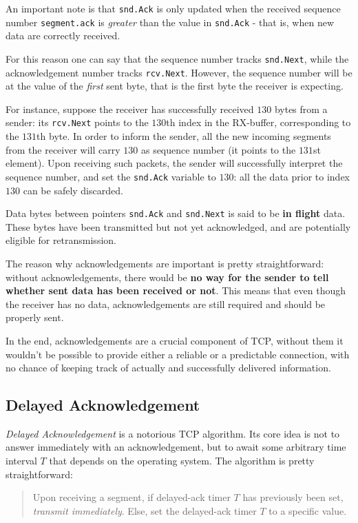 \documentclass[10pt]{\classname}
\begin{document}
An important note is that \texttt{snd.Ack} is only updated when the received
sequence number \texttt{segment.ack} is \emph{greater} than the value in
\texttt{snd.Ack} \-- that is, when new data are correctly received.

For this reason one can say that the sequence number tracks \texttt{snd.Next},
while the acknowledgement number tracks \texttt{rcv.Next}. However, the
sequence number will be at the value of the \emph{first} sent byte, that is the
first byte the receiver is expecting.

For instance, suppose the receiver has successfully received $130$ bytes from a
sender: its \texttt{rcv.Next} points to the $130$th index in the RX-buffer,
corresponding to the $131$th byte. In order to inform the sender, all the new
incoming segments from the receiver will carry $130$ as sequence number (it
points to the $131$st element). Upon receiving such packets, the sender will
successfully interpret the sequence number, and set the \texttt{snd.Ack}
variable to $130$: all the data prior to index $130$ can be safely discarded.

Data bytes between pointers \texttt{snd.Ack} and \texttt{snd.Next} is said to
be \textbf{in flight} data. These bytes have been transmitted but not yet
acknowledged, and are potentially eligible for retransmission.

The reason why acknowledgements are important is pretty straightforward: without
acknowledgements, there would be \textbf{no way for the sender to tell whether
sent data has been received or not}. This means that even though the receiver
has no data, acknowledgements are still required and should be properly sent.

In the end, acknowledgements are a crucial component of TCP, without them it
wouldn't be possible to provide either a reliable or a predictable connection,
with no chance of keeping track of actually and successfully delivered
information.


\subsection{Delayed Acknowledgement}

\emph{Delayed Acknowledgement} is a notorious TCP algorithm. Its core idea is
not to answer immediately with an acknowledgement, but to await some arbitrary
time interval $T$ that depends on the operating system. The algorithm is pretty
straightforward:

\begin{quote}
Upon receiving a segment, if delayed-ack timer $T$ has previously been set,
\emph{transmit immediately}. Else, set the delayed-ack timer $T$ to a specific
value.
\end{quote}
\end{document}
